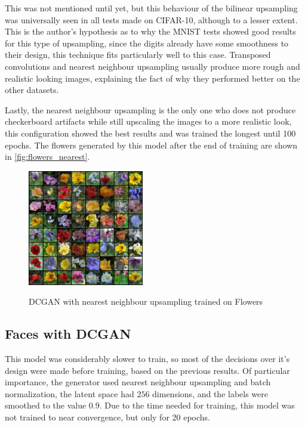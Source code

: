 This was not mentioned until yet, but this behaviour of the bilinear upsampling was universally seen in all tests made on \gls{CIFAR}-10, although to a lesser extent. This is the author's hypothesis as to why the \gls{MNIST} tests showed good results for this type of upsampling, since the digits already have some smoothness to their design, this technique fits particularly well to this case. Transposed convolutions and nearest neighbour upsampling usually produce more rough and realistic looking images, explaining the fact of why they performed better on the other datasets.

Lastly, the nearest neighbour upsampling is the only one who does not produce checkerboard artifacts while still upscaling the images to a more realistic look, this configuration showed the best results and was trained the longest until 100 epochs. The flowers generated by this model after the end of training are shown in \autoref{fig:flowers_nearest}.
\begin{figure}[hbt]
    \centering
    \caption{DCGAN with nearest neighbour upsampling trained on Flowers}
    \includegraphics[width=0.45\textwidth]{chapters/Experiments/Other/flowers_nearest.png}
    \label{fig:flowers_nearest}
\end{figure}

\subsection{Faces with DCGAN}
This model was considerably slower to train, so most of the decisions over it's design were made before training, based on the previous results. Of particular importance, the generator used nearest neighbour upsampling and batch normalization, the latent space had $256$ dimensions, and the labels were smoothed to the value $0.9$. Due to the time needed for training, this model was not trained to near convergence, but only for 20 epochs.

